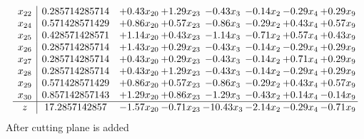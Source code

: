 \documentclass[8pt]{article}
\begin{document}
\[\begin{array}{c| c c@{\hskip 2pt} c@{\hskip 2pt} c@{\hskip 2pt} c@{\hskip 2pt} c@{\hskip 2pt} c@{\hskip 2pt} }
 x_{22}   &  0.285714285714 & +  0.43 x_{20} & +  1.29 x_{23} & -0.43 x_{3} & -0.14 x_{2} & -0.29 x_{4} & +  0.29 x_{9}\\
 x_{24}   &  0.571428571429 & +  0.86 x_{20} & +  0.57 x_{23} & -0.86 x_{3} & -0.29 x_{2} & +  0.43 x_{4} & +  0.57 x_{9}\\
 x_{25}   &  0.428571428571 & +  1.14 x_{20} & +  0.43 x_{23} & -1.14 x_{3} & -0.71 x_{2} & +  0.57 x_{4} & +  0.43 x_{9}\\
 x_{26}   &  0.285714285714 & +  1.43 x_{20} & +  0.29 x_{23} & -0.43 x_{3} & -0.14 x_{2} & -0.29 x_{4} & +  0.29 x_{9}\\
 x_{27}   &  0.285714285714 & +  0.43 x_{20} & +  0.29 x_{23} & -0.43 x_{3} & -0.14 x_{2} & +  0.71 x_{4} & +  0.29 x_{9}\\
 x_{28}   &  0.285714285714 & +  0.43 x_{20} & +  1.29 x_{23} & -0.43 x_{3} & -0.14 x_{2} & -0.29 x_{4} & +  0.29 x_{9}\\
 x_{29}   &  0.571428571429 & +  0.86 x_{20} & +  0.57 x_{23} & -0.86 x_{3} & -0.29 x_{2} & +  0.43 x_{4} & +  0.57 x_{9}\\
 x_{30}   &  0.857142857143 & +  1.29 x_{20} & +  0.86 x_{23} & -1.29 x_{3} & -0.43 x_{2} & +  0.14 x_{4} & -0.14 x_{9}\\
\hline
z    &  17.2857142857 & -1.57 x_{20} & -0.71 x_{23} & -10.43 x_{3} & -2.14 x_{2} & -0.29 x_{4} & -0.71 x_{9}\\
\end{array}\]
 After cutting plane is added 
\end{document}
